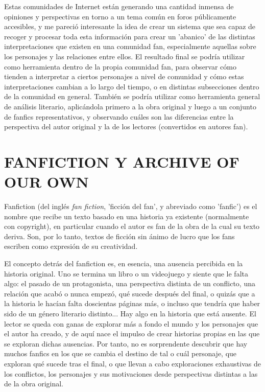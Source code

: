\documentclass{pre-tfg}
\begin{document}
Estas comunidades de Internet están generando una cantidad inmensa de opiniones y perspectivas en torno a un tema común en foros públicamente accesibles, y me pareció interesante la idea de crear un sistema que sea capaz de recoger y procesar toda esta información para crear un 'abanico' de las distintas interpretaciones que existen en una comunidad fan, especialmente aquellas sobre los personajes y las relaciones entre ellos. El resultado final se podría utilizar como herramienta dentro de la propia comunidad fan, para observar cómo tienden a interpretar a ciertos personajes a nivel de comunidad y cómo estas interpretaciones cambian a lo largo del tiempo, o en distintas subsecciones dentro de la comunidad en general. También se podría utilizar como herramienta general de análisis literario, aplicándola primero a la obra original y luego a un conjunto de fanfics representativos, y observando cuáles son las diferencias entre la perspectiva del autor original y la de los lectores (convertidos en autores fan).





\cleardoublepage
\section{FANFICTION Y ARCHIVE OF OUR OWN}

Fanfiction (del inglés \textit{fan fiction}, 'ficción del fan', y abreviado como 'fanfic') es el nombre que recibe un texto basado en una historia ya existente (normalmente con copyright), en particular cuando el autor es fan de la obra de la cual su texto deriva. Son, por lo tanto, textos de ficción sin ánimo de lucro que los fans escriben como expresión de su creatividad.

El concepto detrás del fanfiction es, en esencia, una ausencia percibida en la historia original. Uno se termina un libro o un videojuego y siente que le falta algo: el pasado de un protagonista, una perspectiva distinta de un conflicto, una relación que acabó o nunca empezó, qué sucede después del final, o quizás que a la historia le hacían falta doscientas páginas más, o incluso que tendría que haber sido de un género literario distinto... Hay algo en la historia que está ausente. El lector se queda con ganas de explorar más a fondo el mundo y los personajes que el autor ha creado, y de aquí nace el impulso de crear historias propias en las que se exploran dichas ausencias. Por tanto, no es sorprendente descubrir que hay muchos fanfics en los que se cambia el destino de tal o cuál personaje, que exploran qué sucede tras el final, o que llevan a cabo exploraciones exhaustivas de los conflictos, los personajes y sus motivaciones desde perspectivas distintas a las de la obra original.
\end{document}
